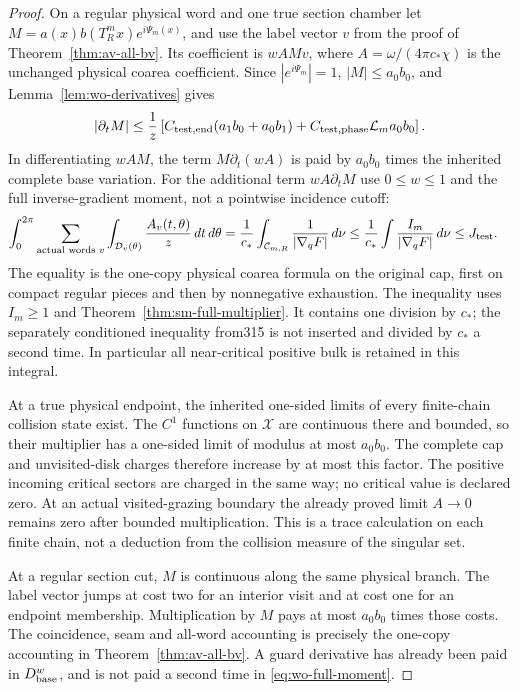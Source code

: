 \begin{proof}
On a regular physical word and one true section chamber let
$M=a(x)b(T_R^mx)e^{i\Psi_m(x)}$, and use the label vector $v$
from the proof of Theorem~\ref{thm:av-all-bv}.  Its coefficient is
$wAMv$, where $A=\omega/(4\pi c_*\chi)$ is the unchanged
physical coarea coefficient.  Since $|e^{i\Psi_m}|=1$,
$|M|\le a_0b_0$, and Lemma~\ref{lem:wo-derivatives} gives
\begin{equation}\label{eq:wo-product-derivative}
 |\partial_t M|\le\frac1z
 \left[C_{\rm test,end}(a_1b_0+a_0b_1)
                 +C_{\rm test,phase}\mathcal L_m a_0b_0\right].
\end{equation}
In differentiating $wAM$, the term $M\partial_t(wA)$ is paid
by $a_0b_0$ times the inherited complete base variation.  For
the additional term $wA\partial_tM$ use $0\le w\le1$ and
the full inverse-gradient moment, not a pointwise incidence cutoff:
\begin{align}
 \int_0^{2\pi}\sum_{\text{actual words }v}
       \int_{\mathcal D_v(\theta)}\frac{A_v(t,\theta)}{z}\,dt\,d\theta
 &=\frac1{c_*}\int_{\mathcal C_{m,R}}\frac1{|\nabla_qF|}\,d\nu
 \le\frac1{c_*}\int\frac{I_m}{|\nabla_qF|}\,d\nu
 \le J_{\rm test}.                                  \label{eq:wo-full-moment}
\end{align}
The equality is the one-copy physical coarea formula on the
original cap, first on compact regular pieces and then by
nonnegative exhaustion.  The inequality uses $I_m\ge1$ and
Theorem~\ref{thm:sm-full-multiplier}.  It contains one division
by $c_*$; the separately conditioned inequality from315 is not
inserted and divided by $c_*$ a second time.  In particular all
near-critical positive bulk is retained in this integral.

At a true physical endpoint, the inherited one-sided limits of
every finite-chain collision state exist.  The $C^1$ functions
on $\mathcal X$ are continuous there and bounded, so their
multiplier has a one-sided limit of modulus at most $a_0b_0$.
The complete cap and unvisited-disk charges therefore increase
by at most this factor.  The positive incoming critical sectors
are charged in the same way; no critical value is declared zero.
At an actual visited-grazing boundary the already proved limit
$A\longrightarrow0$ remains zero after bounded multiplication.
This is a trace calculation on each finite chain, not a
deduction from the collision measure of the singular set.

At a regular section cut, $M$ is continuous along the same
physical branch.  The label vector jumps at cost two for an
interior visit and at cost one for an endpoint membership.
Multiplication by $M$ pays at most $a_0b_0$ times those costs.
The coincidence, seam and all-word accounting is precisely the
one-copy accounting in Theorem~\ref{thm:av-all-bv}.  A guard
derivative has already been paid in $D_{\rm base}^w$, and is
not paid a second time in \eqref{eq:wo-full-moment}.


\end{proof}
